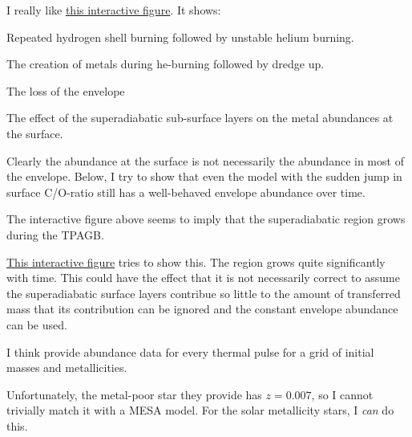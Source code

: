 \documentclass[a4paper,10pt]{article}
\begin{document}
I really like \href{https://s-koen.github.io/figures/#/plots/master-internship/w21/dredge-up}{this interactive figure}. It shows:
\begin{enumd}
    \item  Repeated hydrogen shell burning followed by unstable helium burning.
    \item  The creation of metals during he-burning followed by dredge up.
    \item  The loss of the envelope
    \item The effect of the superadiabatic sub-surface layers on the metal abundances at the surface.
\end{enumd}

Clearly the abundance at the surface is not necessarily the abundance in most of the envelope. Below, I try to show that even the model with the sudden jump in surface C/O-ratio still has a well-behaved envelope abundance over time.

\begin{figure}[ht]
    \centering
\end{figure}

The interactive figure above seems to imply that the superadiabatic region grows during the TPAGB.

\href{https://s-koen.github.io/figures/#/plots/master-internship/w21/super-ad}{This interactive figure} tries to show this. The region grows quite significantly with time. This could have the effect that it is not necessarily correct to assume the superadiabatic surface layers contribue so little to the amount of transferred mass that its contribution can be ignored and the constant envelope abundance can be used.

I think \citet{karakas2016} provide abundance data for every thermal pulse for a grid of initial masses and metallicities.

Unfortunately, the metal-poor star they provide has \(z=0.007\), so I cannot trivially match it with a MESA model. 
For the solar metallicity stars, I \emph{can} do this. 
\begin{figure}[ht]
    \centering
\end{figure}
\end{document}
